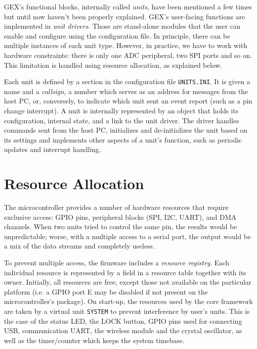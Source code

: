 GEX's functional blocks, internally called \textit{units}, have been mentioned a few times but until now haven't been properly explained. GEX's user-facing functions are implemented in \textit{unit drivers}. Those are stand-alone modules that the user can enable and configure using the configuration file. In principle, there can be multiple instances of each unit type. However, in practice, we have to work with hardware constraints: there is only one ADC peripheral, two SPI ports and so on. This limitation is handled using resource allocation, as explained below.

Each unit is defined by a section in the configuration file \verb|UNITS.INI|. It is given a name and a \textit{callsign}, a number which serves as an address for messages from the host PC, or, conversely, to indicate which unit sent an event report (such as a pin change interrupt). A unit is internally represented by an object that holds its configuration, internal state, and a link to the unit driver. The driver handles commands sent from the host PC, initializes and de-initializes the unit based on its settings and implements other aspects of a unit's function, such as periodic updates and interrupt handling.

\section{Resource Allocation}

The microcontroller provides a number of hardware resources that require exclusive access: GPIO pins, peripheral blocks (SPI, I2C, UART\textellipsis), and DMA channels. When two units tried to control the same pin, the results would be unpredictable; worse, with a multiple access to a serial port, the output would be a mix of the data streams and completely useless. 

To prevent multiple access, the firmware includes a \textit{resource registry}. Each individual resource is represented by a field in a resource table together with its owner. Initially, all resources are free, except those not available on the particular platform (i.e. a GPIO port E may be disabled if not present on the microcontroller's package). On start-up, the resources used by the core framework are taken by a virtual unit \verb|SYSTEM| to prevent interference by user's units. This is the case of the status LED, the LOCK button, GPIO pins used for connecting USB, communication UART, the wireless module and the crystal oscillator, as well as the timer/counter which keeps the system timebase.

